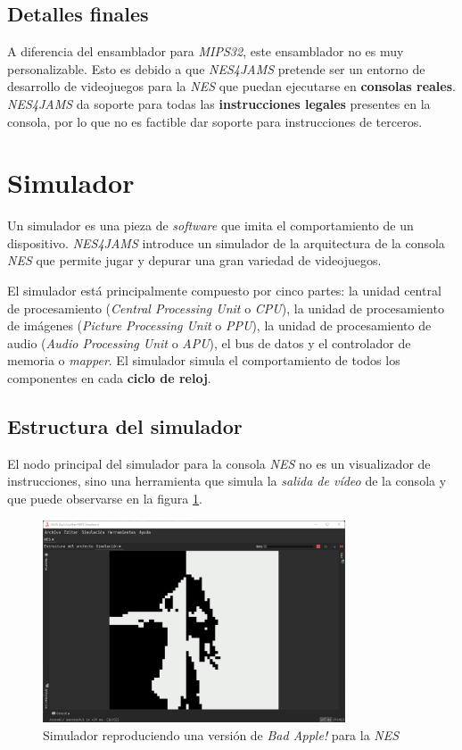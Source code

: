 \subsection{Detalles finales}\label{subsec:detalles-finales}

A diferencia del ensamblador para \textit{MIPS32},
este ensamblador no es muy personalizable.
Esto es debido a que \textit{NES4JAMS} pretende
ser un entorno de desarrollo de videojuegos para la \textit{NES}
que puedan ejecutarse en \textbf{consolas reales}.
\textit{NES4JAMS} da soporte para todas las
\textbf{instrucciones legales} presentes en la consola,
por lo que no es factible dar soporte para instrucciones
de terceros.


\section{Simulador}\label{sec:simulador}

Un simulador es una pieza de \textit{software} que imita el
comportamiento de un dispositivo.
\textit{NES4JAMS} introduce un simulador de la arquitectura
de la consola \textit{NES} que permite jugar y depurar
una gran variedad de videojuegos.

El simulador está principalmente compuesto por cinco partes:
la unidad central de procesamiento
(\textit{Central Processing Unit} o \textit{CPU}),
la unidad de procesamiento de imágenes
(\textit{Picture Processing Unit} o \textit{PPU}),
la unidad de procesamiento de audio
(\textit{Audio Processing Unit} o \textit{APU}),
el bus de datos y el controlador de memoria o \textit{mapper}.
El simulador simula el comportamiento de todos los componentes
en cada \textbf{ciclo de reloj}.

\subsection{Estructura del simulador}\label{subsec:estructura-del-simulador}

El nodo principal del simulador para la consola \emph{NES} no
es un visualizador de instrucciones, sino una herramienta que
simula la \textit{salida de vídeo} de la consola y que puede
observarse en la figura \ref{fig:nes-video}.

\begin{figure}[h]
    \centering
    \includegraphics[width=0.8\textwidth]{images/nes/nes-video}
    \caption{Simulador reproduciendo una versión de \textit{Bad Apple!} para la \textit{NES}}
    \label{fig:nes-video}
\end{figure}

